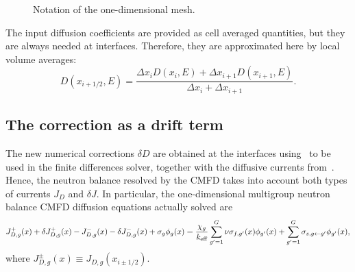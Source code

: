 \begin{figure}[htbp] 
	\centering
	\caption{Notation of the one-dimensional mesh.}
	\label{fig:mesh1D}
\end{figure}
%
The input diffusion coefficients are provided as cell averaged quantities, but they are always needed at interfaces. Therefore, they are approximated here by local volume averages:
\begin{equation}\label{eq:Ds}
D(x_{i+1/2},E) = \frac{\Delta x_i D(x_i,E) 
	+ \Delta x_{i+1} D(x_{i+1},E)}
{ \Delta x_i + \Delta x_{i+1}} .
\end{equation}

%
\subsection{The correction as a drift term}
\label{sec:corr-drift}

The new numerical corrections $\delta D$ are obtained at the interfaces using~ to be used in the finite differences solver, together with the diffusive currents from~. Hence, the neutron balance resolved by the CMFD takes into account both types of currents $J_D$ and $\delta J$. %
In particular, the one-dimensional multigroup neutron balance CMFD diffusion equations actually solved are
\begin{equation}\label{eq:diff1}
J_{D,g}^+(x) + \delta J_{D,g}^+(x) -  J_{D,g}^-(x) - \delta J_{D,g}^-(x) + \sigma_{g}\phi_g(x) =  \frac{\chi_g}{{k_{\textrm{\scriptsize{eff}}}}}\sum\limits_{g'=1}^G\nu\sigma_{f,g'}(x)\phi_{g'}(x) + \sum\limits_{g'=1}^G\sigma_{s,g\leftarrow g'}\phi_{g'}(x),
\end{equation}
where $J_{D,g}^\pm (x)\equiv J_{D,g}(x_{i\pm 1/2})$.

